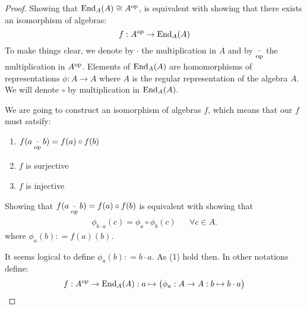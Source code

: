\begin{proof}
Showing that \(\operatorname{End}_{A} (A) \cong  A^{\operatorname{op}}\), is equivalent with showing that there exists an isomorphism of algebras:
\[
f :A^{\operatorname{op}} \rightarrow  \operatorname{End}_{A} (A) 
\]
To make things clear, we denote by \(\cdot \) the multiplication in \(A\) and by \(\underset{\operatorname{op}}{\cdot }\) the multiplication in \(A^{\operatorname{op}}\). Elements of \(\operatorname{End}_{A} (A)\) are homomorphisms of representations \(\phi : A\rightarrow A\) where \(A\) is the regular representation of the algebra \(A\). We will denote \(\circ \) by multiplication in \(\operatorname{End}_{A} (A)\).

We are going to construct an isomorphism of algebras \(f\), which means that our \(f\) must satsify:

\begin{enumerate}
  \item \(f(a\underset{\operatorname{op}}{\cdot }b)=f(a) \circ f(b)\)
  \item \(f\) is surjective
  \item \(f\) is injective
\end{enumerate}

Showing that  \(f(a\underset{\operatorname{op}}{\cdot }b)=f(a) \circ f(b)\) is equivalent with showing that
\begin{align*}
\phi _{b\cdot a} (c) =\phi _{a}\circ \phi _{b}(c) && \forall c \in  A.
\end{align*}
where \(\phi _{a}(b): = f(a)(b)\).

It seems logical to define \(\phi _{a}(b): = b\cdot a\). As (1) hold then. In other notations define:
\[
f :A^{\operatorname{op}} \rightarrow  \operatorname{End}_{A} (A) : a \mapsto \big(\phi _{a} : A \rightarrow  A:b \mapsto b\cdot a\big)
\]


\end{proof}
